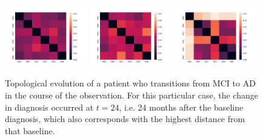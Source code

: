 \documentclass{article}
\begin{document}
\begin{figure}
  \centering \includegraphics[width=0.32\textwidth]{figures/temporal_evolution/ADNI029S0878_h_0.png}
  \hfill \includegraphics[width=0.32\textwidth]{figures/temporal_evolution/ADNI029S0878_h_1.png}
  \hfill \includegraphics[width=0.32\textwidth]{figures/temporal_evolution/ADNI029S0878_h_2.png}
    \caption{Topological evolution of a patient who transitions from MCI to AD in the course of the
      observation. For this particular case, the change in diagnosis occurred at $t=24$, i.e. 24
      months after the baseline diagnosis, which also corresponds with the highest distance from
      that baseline.}
    \label{fig:patient_evolution_mci_ad}
\end{figure}
\end{document}
